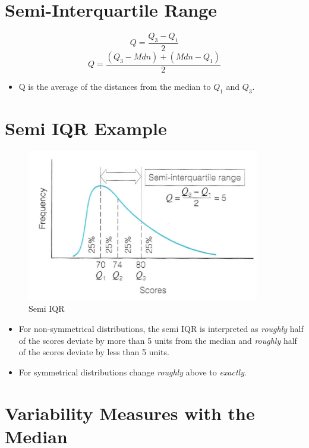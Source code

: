 \documentclass[12pt]{article}
\begin{document}
\section{Semi-Interquartile Range}\label{semi-interquartile-range}

\[ Q = \frac{Q_{3} - Q_{1}}{2} \]
\[ Q = \frac{(Q_{3} - Mdn) + (Mdn - Q_{1})}{2} \]

\begin{itemize}
\itemsep1pt\parskip0pt
\item
  Q is the average of the distances from the median to \(Q_{1}\) and
  \(Q_{3}\).
\end{itemize}

\section{Semi IQR Example}\label{semi-iqr-example}

\begin{figure}[H]
\centering
\includegraphics[width=4in]{SemiIQR.png}
\caption{Semi IQR}
\end{figure}

\begin{itemize}
\itemsep1pt\parskip0pt
\item
  For non-symmetrical distributions, the semi IQR is interpreted as
  \emph{roughly} half of the scores deviate by more than 5 units from
  the median and \emph{roughly} half of the scores deviate by less than
  5 units.
\item
  For symmetrical distributions change \emph{roughly} above to
  \emph{exactly}.
\end{itemize}

\section{Variability Measures with the
Median}\label{variability-measures-with-the-median}
\end{document}
